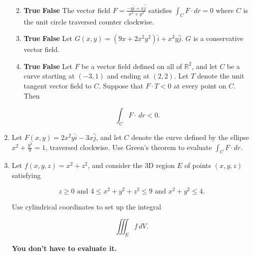 \documentclass[12 pt]{report}
\begin{document}
\begin{enumerate}
\begin{enumerate}
\vfill

\item \textbf{True} \hspace{5pt} \textbf{False} \hspace{10pt} The vector field $F = \frac{-y \hat{i} + x \hat{j}}{x^2+y^2}$ satisfies $\int_C F \cdot dr = 0$ where $C$ is the unit circle traversed counter clockwise. 

\vfill

\item \textbf{True} \hspace{5pt} \textbf{False} \hspace{10pt} Let $G(x,y) = (9x + 2x^2 y^2) \hat{i} + x^3 y \hat{j}$. $G$ is a conservative vector field. 

\vfill

\item \textbf{True} \hspace{5pt} \textbf{False} \hspace{10pt} Let $F$ be a vector field defined on all of $\mathbb{R}^2$, and let $C$ be a curve starting at $(-3,1)$ and ending at $(2,2)$. Let $T$ denote the unit tangent vector field to $C$. Suppose that $F \cdot T < 0$ at every point on $C$. Then 

\[
\int_C F \cdot \, dr < 0.
\]

\vfill

\end{enumerate}

\newpage


\item Let $F(x,y) = 2x^2y \hat{i} - 3x \hat{j}$, and let $C$ denote the curve defined by the ellipse $x^2 + \frac{y^2}{9} = 1$, traversed clockwise. Use Green's theorem to evaluate $\int_C F \cdot dr$. 


\newpage

\item Let $f(x,y,z) = x^2 + z^2$, and consider the 3D region $E$ of points $(x,y,z)$ satisfying 

\[
z \geq 0 \text{ and } 4 \leq x^2+y^2+z^2 \leq 9 \text{ and } x^2 + y^2 \leq 4.
\]

Use cylindrical coordinates to set up the integral

\[
\iiint_E f \, dV.
\]

\textbf{You don't have to evaluate it.}


\end{enumerate}
\end{document}
